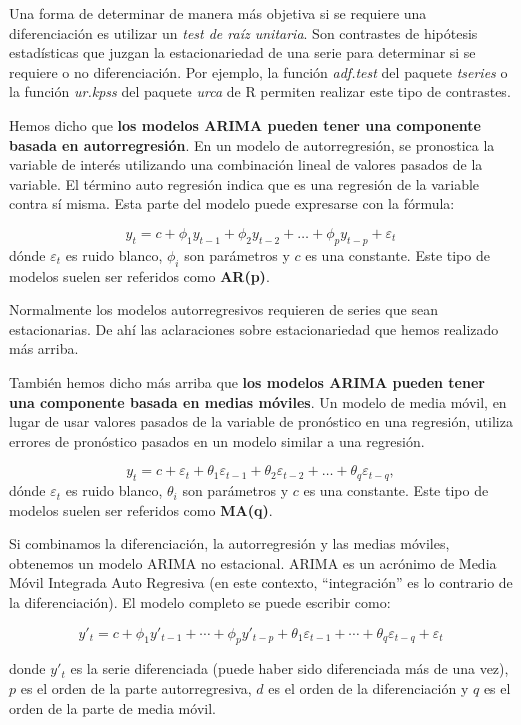 \documentclass[]{book}
\begin{document}
Una forma de determinar de manera más objetiva si se requiere una
diferenciación es utilizar un \emph{test de raíz unitaria}. Son
contrastes de hipótesis estadísticas que juzgan la estacionariedad de
una serie para determinar si se requiere o no diferenciación. Por
ejemplo, la función \emph{adf.test} del paquete \emph{tseries} o la
función \emph{ur.kpss} del paquete \emph{urca} de R permiten realizar
este tipo de contrastes.

Hemos dicho que \textbf{los modelos ARIMA pueden tener una componente
basada en autorregresión}. En un modelo de autorregresión, se pronostica
la variable de interés utilizando una combinación lineal de valores
pasados de la variable. El término auto regresión indica que es una
regresión de la variable contra sí misma. Esta parte del modelo puede
expresarse con la fórmula:

\[y_{t} = c + \phi_{1}y_{t-1} + \phi_{2}y_{t-2} + \dots + \phi_{p}y_{t-p} + \varepsilon_{t}\]
dónde \(\varepsilon_{t}\) es ruido blanco, \(\phi_{i}\) son parámetros y
\(c\) es una constante. Este tipo de modelos suelen ser referidos como
\textbf{AR(p)}.

Normalmente los modelos autorregresivos requieren de series que sean
estacionarias. De ahí las aclaraciones sobre estacionariedad que hemos
realizado más arriba.

También hemos dicho más arriba que \textbf{los modelos ARIMA pueden
tener una componente basada en medias móviles}. Un modelo de media
móvil, en lugar de usar valores pasados de la variable de pronóstico en
una regresión, utiliza errores de pronóstico pasados en un modelo
similar a una regresión.

\[y_{t} = c + \varepsilon_t + \theta_{1}\varepsilon_{t-1} + \theta_{2}\varepsilon_{t-2} + \dots + \theta_{q}\varepsilon_{t-q},\]
dónde \(\varepsilon_{t}\) es ruido blanco, \(\theta_{i}\) son parámetros
y \(c\) es una constante. Este tipo de modelos suelen ser referidos como
\textbf{MA(q)}.

Si combinamos la diferenciación, la autorregresión y las medias móviles,
obtenemos un modelo ARIMA no estacional. ARIMA es un acrónimo de Media
Móvil Integrada Auto Regresiva (en este contexto, ``integración'' es lo
contrario de la diferenciación). El modelo completo se puede escribir
como:

\[ 
  y'_{t} = c + \phi_{1}y'_{t-1} + \cdots + \phi_{p}y'_{t-p} + \theta_{1}\varepsilon_{t-1} + \cdots + \theta_{q}\varepsilon_{t-q} + \varepsilon_{t}
\]

donde \(y'_{t}\) es la serie diferenciada (puede haber sido diferenciada
más de una vez), \(p\) es el orden de la parte autorregresiva, \(d\) es
el orden de la diferenciación y \(q\) es el orden de la parte de media
móvil.
\end{document}
